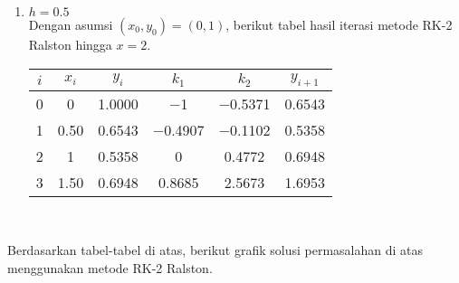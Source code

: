 \documentclass{article}
\begin{document}
\begin{enumerate}
\begin{enumerate}
        \item $h = \num{0,5}$ \\
        Dengan asumsi $(x_0, y_0) = (0, 1)$, berikut tabel hasil iterasi metode RK-2 Ralston hingga $x = 2$. \\
        \begin{tabular}{|c|c|c|c|c|c|}
            \hline
            $i$ & $x_i$ & $y_i$ & $k_1$ & $k_2$ & $y_{i+1}$ \\
            \hline
            0 & \num{0} & \num{1,0000} & \num{-1} & \num{-0,5371} & \num{0,6543} \\
            1 & \num{0,50} & \num{0,6543} & \num{-0,4907} & \num{-0,1102} & \num{0,5358} \\
            2 & \num{1} & \num{0,5358} & \num{0} & \num{0,4772} & \num{0,6948} \\
            3 & \num{1,50} & \num{0,6948} & \num{0,8685} & \num{2,5673} & \num{1,6953} \\
            \hline
        \end{tabular} \\     
    \end{enumerate}
    Berdasarkan tabel-tabel di atas, berikut grafik solusi permasalahan di atas menggunakan metode RK-2 Ralston. \\

\end{enumerate}
\end{document}

